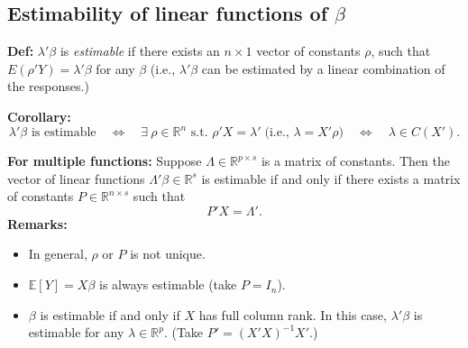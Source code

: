 \documentclass{article}
\theoremstyle{break}
\newcommand{\R}{\ensuremath{\mathbb{R}}}
\newcommand{\E}{\ensuremath{\mathbb{E}}}
\newcommand{\st}{\ensuremath{\text{ s.t. }}}
\begin{document}
\subsection{Estimability of linear functions of $\beta$}\label{sec:lm-estimability}
\textbf{Def:} $\lambda' \beta$ is \emph{estimable} if there exists an $n \times 1$ vector of constants $\rho$, such that $E(\rho' Y) = \lambda' \beta$ for any $\beta$ (i.e., $\lambda' \beta$ can be estimated by a linear combination of the responses.)

\textbf{Corollary:}
\[
\text{$\lambda' \beta$ is estimable}
\quad\Longleftrightarrow\quad
\exists\ \rho \in \R^n \st \rho' X = \lambda' \; \text{(i.e., $\lambda = X' \rho$)} 
\quad\Longleftrightarrow\quad 
\lambda \in C(X').
\]

\textbf{For multiple functions:}
Suppose $\Lambda \in \R^{p \times s}$ is a matrix of constants. Then the vector of linear functions $\Lambda' \beta \in \R^s$ is estimable if and only if there exists a matrix of constants $P \in \R^{n \times s}$ such that
\[
P' X = \Lambda'.
\]
\textbf{Remarks:}
\begin{itemize}
    \item In general, $\rho$ or $P$ is not unique.
    \item $\E[Y]=X\beta$ is always estimable (take $P=I_n$).
    \item $\beta$ is estimable if and only if $X$ has full column rank. In this case, $\lambda' \beta$ is estimable for any $\lambda \in \R^p$. (Take $P' = (X'X)^{-1}X'$.)
\end{itemize}
\end{document}
